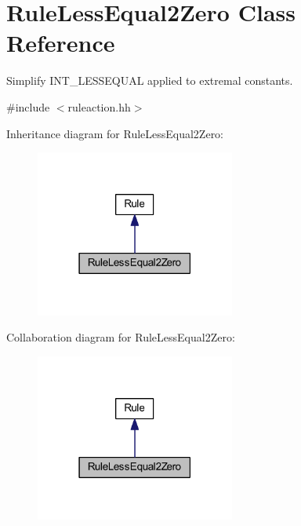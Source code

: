 \hypertarget{class_rule_less_equal2_zero}{}\section{Rule\+Less\+Equal2\+Zero Class Reference}
\label{class_rule_less_equal2_zero}


Simplify I\+N\+T\+\_\+\+L\+E\+S\+S\+E\+Q\+U\+AL applied to extremal constants.  




{\ttfamily \#include $<$ruleaction.\+hh$>$}



Inheritance diagram for Rule\+Less\+Equal2\+Zero\+:
\nopagebreak
\begin{figure}[H]
\begin{center}
\leavevmode
\includegraphics[width=186pt]{class_rule_less_equal2_zero__inherit__graph}
\end{center}
\end{figure}


Collaboration diagram for Rule\+Less\+Equal2\+Zero\+:
\nopagebreak
\begin{figure}[H]
\begin{center}
\leavevmode
\includegraphics[width=186pt]{class_rule_less_equal2_zero__coll__graph}
\end{center}
\end{figure}
